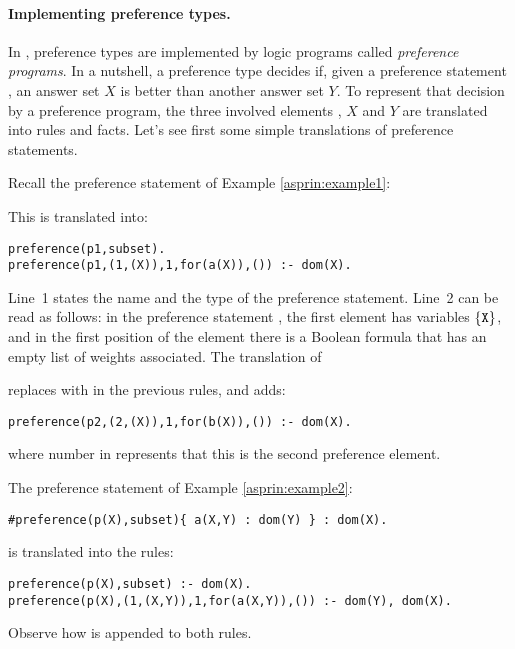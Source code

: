 \paragraph{Implementing preference types.}
In \asprin, preference types are implemented by logic programs called \emph{preference programs}.
In a nutshell, a preference type decides if, 
given a preference statement , 
an answer set $X$ is better than another answer set $Y$.
To represent that decision by a preference program, 
the three involved elements , $X$ and $Y$ are translated into rules and facts.
Let's see first some simple translations of preference statements.
\begin{example}
\label{asprin:example1translated}
Recall the preference statement  of Example \ref{asprin:example1}:

This is translated into: %
\begin{lstlisting}
preference(p1,subset).
preference(p1,(1,(X)),1,for(a(X)),()) :- dom(X).
\end{lstlisting}
Line~1 states the name and the type of the preference statement.
Line~2 can be read as follows:
in the preference statement , the first element has variables $\{\texttt{X}\}$,  
and in the first position of the element there is a Boolean formula  that has an empty list of weights associated.
The translation of 

replaces  with  in the previous rules, and adds:
\begin{lstlisting}[numbers=none]
preference(p2,(2,(X)),1,for(b(X)),()) :- dom(X).
\end{lstlisting}
where number  in  represents that this is the second preference element. 
\end{example}

\begin{example}
The preference statement of Example \ref{asprin:example2}: 
\begin{lstlisting}[numbers=none]
#preference(p(X),subset){ a(X,Y) : dom(Y) } : dom(X).
\end{lstlisting}
is translated into the rules:
\begin{lstlisting}[numbers=none]
preference(p(X),subset) :- dom(X).
preference(p(X),(1,(X,Y)),1,for(a(X,Y)),()) :- dom(Y), dom(X).
\end{lstlisting}
Observe how  is appended to both rules. 
\end{example}

